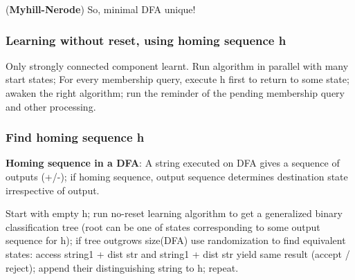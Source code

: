 \documentclass[oneside, article]{memoir}
\begin{document}
(\textbf{Myhill-Nerode}) So, minimal DFA unique!

\subsubsection{Learning without reset, using homing sequence h}
Only strongly connected component learnt. Run algorithm in parallel with many start states; For every membership query, execute h first to return to some state; awaken the right algorithm; run the reminder of the pending membership query and other processing.

\subsubsection{Find homing sequence h}
\textbf{Homing sequence in a DFA}: A string executed on DFA gives a sequence of outputs (+/-); if homing sequence, output sequence determines destination state irrespective of output.

Start with empty h; run no-reset learning algorithm to get a generalized binary classification tree (root can be one of states corresponding to some output sequence for h); if tree outgrows size(DFA) use randomization to find equivalent states: access string1 + dist str and string1 + dist str yield same result (accept / reject); append their distinguishing string to h; repeat.



% 
\end{document}
